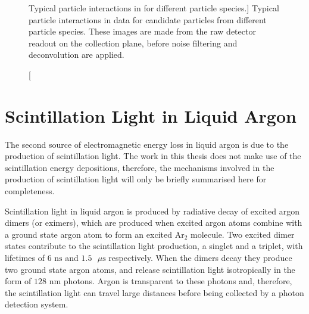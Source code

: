 \begin{figure}
	\caption
	[Typical particle interactions in \protodune{} for different particle 
	species.]
	{Typical particle interactions in \protodune{} data for candidate particles
	from different particle species. These images are made from the raw detector
	readout on the collection plane, before noise filtering and deconvolution are 
	applied. }

	\label{fig:particle_signatures}

\end{figure}

\section{Scintillation Light in Liquid Argon}
The second source of electromagnetic energy loss in liquid argon is due to the
production of scintillation light. The work in this thesis does not make
use of the scintillation energy depositions, therefore, the mechanisms involved
in the production of scintillation light will only be briefly summarised here 
for completeness.

Scintillation light in liquid argon is produced by radiative decay of excited
argon dimers (or eximers), which are produced when excited argon atoms combine
with a ground state argon atom to form an excited $\mbox{Ar}_2$ molecule. Two 
excited dimer states contribute to the scintillation light production, a 
singlet and a triplet, with lifetimes of $6 \mbox{ ns}$ and $1.5 \mbox{ } \mu 
\mbox{s}$ respectively\cite{Lippincott:2008ad}. When the dimers decay they 
produce two ground state argon atoms, and release scintillation light 
isotropically in the form of $128 \mbox{ nm}$ photons. Argon is transparent to 
these photons and, therefore, the scintillation light can travel large 
distances before being collected by a photon detection system.
